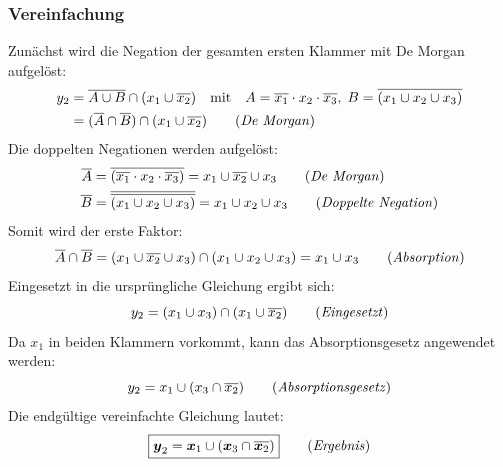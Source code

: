 \subsubsection*{Vereinfachung}
Zunächst wird die Negation der gesamten ersten Klammer mit De Morgan aufgelöst:
\begin{align}
    y_2 &= \overline{ A \cup B } \cap (x_1 \cup \overline{x_2}) \quad \text{mit} \quad
    A = \overline{x_1} \cdot x_2 \cdot \overline{x_3},\; 
    B = \overline{(x_1 \cup x_2 \cup x_3)} \nonumber \\
    &= (\overline{A} \cap \overline{B}) \cap (x_1 \cup \overline{x_2}) \tag{\textit{De Morgan}}
\end{align}
Die doppelten Negationen werden aufgelöst:
\begin{align}
    \overline{A} &= \overline{(\overline{x_1} \cdot x_2 \cdot \overline{x_3})} 
    = x_1 \cup \overline{x_2} \cup x_3 \tag{\textit{De Morgan}} \\
    \overline{B} &= \overline{ \overline{(x_1 \cup x_2 \cup x_3)} } 
    = x_1 \cup x_2 \cup x_3 \tag{\textit{Doppelte Negation}}
\end{align}
Somit wird der erste Faktor:
\begin{equation}
    \overline{A} \cap \overline{B} 
    = (x_1 \cup \overline{x_2} \cup x_3) 
    \cap (x_1 \cup x_2 \cup x_3)
    = x_1 \cup x_3 \tag{\textit{Absorption}}
\end{equation}
Eingesetzt in die ursprüngliche Gleichung ergibt sich:
\begin{equation}
    y_2 = (x_1 \cup x_3) 
    \cap (x_1 \cup \overline{x_2}) \tag{\textit{Eingesetzt}}
\end{equation}
Da $x_1$ in beiden Klammern vorkommt, kann das Absorptionsgesetz 
angewendet werden:
\begin{equation}
    y_2 = x_1 \cup (x_3 \cap \overline{x_2}) \tag{\textit{Absorptionsgesetz}}
\end{equation}
Die endgültige vereinfachte Gleichung lautet:
\begin{equation}
    \boxed{ \boldsymbol{y}_2 = \boldsymbol{x}_1 \cup (\boldsymbol{x}_3 \cap \overline{\boldsymbol{x}_2}) } \tag{\textit{Ergebnis}}
\end{equation}

